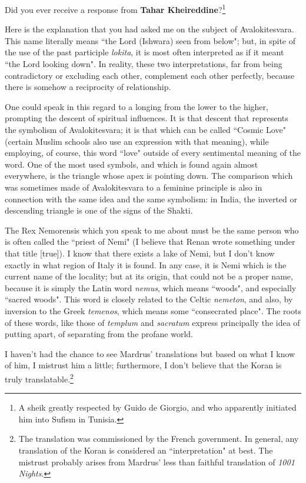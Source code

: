 Did you ever receive a response from \textbf{Tahar Kheireddine}?\footnote{A sheik greatly respected by Guido de Giorgio, and who apparently initiated him into Sufism in Tunisia.}

Here is the explanation that you had asked me on the subject of Avalokitesvara. This name literally means ``the Lord (Ishwara) seen from below"; but, in spite of the use of the past participle \emph{lokita}, it is most often interpreted as if it meant ``the Lord looking down". In reality, these two interpretations, far from being contradictory or excluding each other, complement each other perfectly, because there is somehow a reciprocity of relationship.

One could speak in this regard to a longing from the lower to the higher, prompting the descent of spiritual influences. It is that descent that represents the symbolism of Avalokitesvara; it is that which can be called ``Cosmic Love" (certain Muslim schools also use an expression with that meaning), while employing, of course, this word ``love" outside of every sentimental meaning of the word. One of the most used symbols, and which is found again almost everywhere, is the triangle whose apex is pointing down. The comparison which was sometimes made of Avalokitesvara to a feminine principle is also in connection with the same idea and the same symbolism: in India, the inverted or descending triangle is one of the signs of the Shakti.

The Rex Nemorensis which you speak to me about must be the same person who is often called the ``priest of Nemi" (I believe that Renan wrote something under that title [true]). I know that there exists a lake of Nemi, but I don't know exactly in what region of Italy it is found. In any case, it is Nemi which is the current name of the locality; but at its origin, that could not be a proper name, because it is simply the Latin word \emph{nemus}, which means ``woods", and especially ``sacred woods". This word is closely related to the Celtic \emph{nemeton}, and also, by inversion to the Greek \emph{temenos}, which means some ``consecrated place". The roots of these words, like those of \emph{templum} and \emph{sacratum} express principally the idea of putting apart, of separating from the profane world.

I haven't had the chance to see Mardrus' translations but based on what I know of him, I mistrust him a little; furthermore, I don't believe that the Koran is truly translatable.\footnote{The translation was commissioned by the French government. In general, any translation of the Koran is considered an ``interpretation" at best. The mistrust probably arises from Mardrus' less than faithful translation of \emph{1001 Nights}.}

